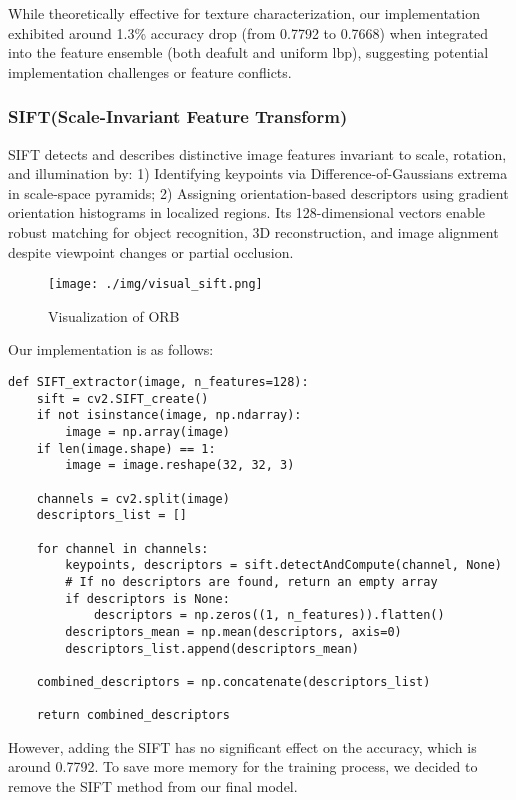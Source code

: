 \documentclass[a4paper,11pt]{article}
\begin{document}
While theoretically effective for texture characterization, our implementation exhibited around 1.3\% accuracy drop (from 0.7792 to 0.7668) when integrated into the feature ensemble (both deafult and uniform lbp), suggesting potential implementation challenges or feature conflicts.

\subsubsection{SIFT(Scale-Invariant Feature Transform)}

SIFT detects and describes distinctive image features invariant to scale, rotation, and illumination by: 1) Identifying keypoints via Difference-of-Gaussians extrema in scale-space pyramids; 2) Assigning orientation-based descriptors using gradient orientation histograms in localized regions. Its 128-dimensional vectors enable robust matching for object recognition, 3D reconstruction, and image alignment despite viewpoint changes or partial occlusion.

\begin{figure}[H]
    \centering
    \texttt{[image: ./img/visual\_sift.png]}
    \caption[visual_hog] {Visualization of ORB}
\end{figure}

Our implementation is as follows:

\begin{verbatim}
def SIFT_extractor(image, n_features=128):
    sift = cv2.SIFT_create()
    if not isinstance(image, np.ndarray):
        image = np.array(image)
    if len(image.shape) == 1:
        image = image.reshape(32, 32, 3) 

    channels = cv2.split(image)
    descriptors_list = []
    
    for channel in channels:
        keypoints, descriptors = sift.detectAndCompute(channel, None)
        # If no descriptors are found, return an empty array
        if descriptors is None:
            descriptors = np.zeros((1, n_features)).flatten()
        descriptors_mean = np.mean(descriptors, axis=0)
        descriptors_list.append(descriptors_mean)
        
    combined_descriptors = np.concatenate(descriptors_list)

    return combined_descriptors
\end{verbatim}

However, adding the SIFT has no significant effect on the accuracy, which is around 0.7792.
To save more memory for the training process, we decided to remove the SIFT method from our final model.
\end{document}
